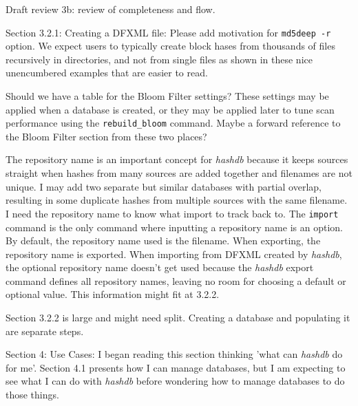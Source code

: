 \documentclass[12pt,twoside]{article}
\newcommand{\hdb}{\emph{hashdb}\xspace}
\begin{document}
Draft review 3b: review of completeness and flow.

Section 3.2.1: Creating a DFXML file:
Please add motivation for \texttt{md5deep -r} option.
We expect users to typically create block hases from thousands of files
recursively in directories,
and not from single files as shown in these nice unencumbered examples
that are easier to read.

Should we have a table for the Bloom Filter settings?
These settings may be applied when a database is created,
or they may be applied later to tune scan performance
using the \texttt{rebuild\_bloom} command.
Maybe a forward reference to the Bloom Filter section from these two places?

The repository name is an important concept for \hdb because
it keeps sources straight when hashes from many sources
are added together and filenames are not unique.
I may add two separate but similar databases
with partial overlap, resulting in some duplicate hashes
from multiple sources with the same filename.
I need the repository name to know what import to track back to.
The \texttt{import} command is the only command where
inputting a repository name is an option.
By default, the repository name used is the filename.
When exporting, the repository name is exported.
When importing from DFXML created by \hdb,
the optional repository name doesn't get used
because the \hdb export command defines all repository names,
leaving no room for choosing a default or optional value.
This information might fit at 3.2.2.

Section 3.2.2 is large and might need split.
Creating a database and populating it are separate steps.

Section 4: Use Cases:
I began reading this section thinking 'what can \hdb do for me'.
Section 4.1 presents how I can manage databases,
but I am expecting to see what I can do with \hdb
before wondering how to manage databases to do those things.
\end{document}
